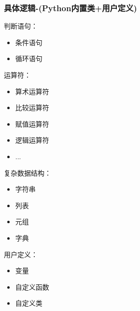 \documentclass[11pt]{beamer}
\begin{document}
\begin{frame}[fragile]
	\frametitle{具体逻辑-(Python内置类+用户定义)}
	\begin{minipage}[t]{0.25\linewidth}
		判断语句：
		\begin{itemize}
			\item 条件语句
			\item 循环语句
		\end{itemize}
	\end{minipage}%
	\begin{minipage}[t]{0.25\linewidth}
		运算符：
		\begin{itemize}
			\item 算术运算符
			\item  比较运算符
			\item 赋值运算符
			\item 逻辑运算符
			\item ...
		\end{itemize}
	\end{minipage}%
	\begin{minipage}[t]{0.25\linewidth}
复杂数据结构：
\begin{itemize}
	\item 字符串
	\item 列表
	\item 元组
	\item 字典
\end{itemize}
\end{minipage}%
	\begin{minipage}[t]{0.25\linewidth}
	用户定义：
	\begin{itemize}
		\item 变量
		\item 自定义函数
		\item 自定义类
	\end{itemize}
\end{minipage}
\end{frame}
\end{document}
